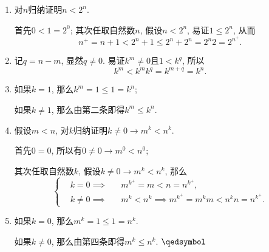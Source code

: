 \documentclass[UTF8]{ctexart}
\begin{document}

\begin{enumerate}
    \item 对$n$归纳证明$n<2^n$.
    
    \hspace{2.17em}
    首先$0<1=2^0$;
    其次任取自然数$n$, 假设$n<2^n$, 易证$1\leqslant 2^n$, 从而
    \[
        n^+=n+1<2^n+1\leqslant 2^n+2^n=2^n2=2^{n^+}.
    \]

    \item 记$q=n-m$, 显然$q\neq 0$. 易证$k^m\neq 0$且$1<k^q$, 所以
    \[        
        k^m<k^mk^q=k^{m+q}=k^n.
    \]

    \item 如果$k=1$, 那么$k^m=1\leqslant 1=k^n$;
    
    \hspace{2.17em}
    如果$k\neq 1$, 那么由第二条即得$k^m\leqslant k^n$.
    
    \item 假设$m<n$, 对$k$归纳证明$k\neq 0\to m^k<n^k$.
    
    \hspace{2.17em}
    首先$0=0$, 所以有$0\neq 0\to m^0<n^0$;
    
    \hspace{2.17em}
    其次任取自然数$k$, 假设$k\neq 0\to m^k<n^k$, 那么
    \[\left\{\begin{aligned}
        &k=0\implies&&m^{k^+}=m<n=n^{k^+},\\[-3pt]
        &k\neq 0\implies&&m^k<n^k\implies m^{k^+}=m^km<n^kn=n^{k^+}.
    \end{aligned}\right.\]

    \item 如果$k=0$, 那么$m^k=1\leqslant 1=n^k$.
    
    \hspace{2.17em}
    如果$k\neq 0$, 那么由第四条即得$m^k\leqslant n^k$. \hfill $\qedsymbol$
\end{enumerate}

\end{document}
